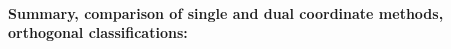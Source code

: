 \documentclass[9pt,bestpractices]{livecoms}
\begin{document}


\paragraph{Summary, comparison of single and dual coordinate methods, orthogonal classifications:}

\end{document}
